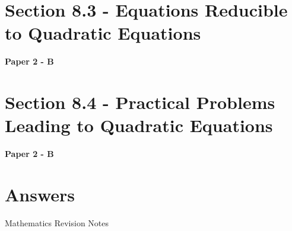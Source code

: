 \documentclass[12pt, a4paper]{article}
\begin{document}
\section*{Section 8.3 - Equations Reducible to Quadratic Equations \NF}\label{section:4-8-3}

\textbf{Paper 2 - B}
\begin{enumx}[label=\arabic*.,start=2]
\item {}\label{DSE2013-CoreP2-Q34} 
\item {}\label{DSE2017-CoreP2-Q33} 
\item {}\label{DSE2017-CoreP2-Q34} 
\item {}\label{DSE2019-CoreP2-Q32} 
\end{enumx}




\section*{Section 8.4 - Practical Problems Leading to Quadratic Equations \NF}\label{section:4-8-4}

\textbf{Paper 2 - B}
\begin{enumx}[label=\arabic*.,start=6]
\item {}\label{DSE2020-CoreP2-Q32} 
\end{enumx}
\section*{Answers}
\begin{enumx}[label=\arabic*.,start=1]
\item {}
\item {}
\item {}
\item {}
\item {}
\item {}
\end{enumx}
\newpage
\newpage
\thispagestyle{empty}
\begin{center}
Mathematics Revision Notes\\\vspace{1cm}
\\\vspace{1cm}
{\fontsize{24pt}{24pt}\selectfont {Variations}} \\\vspace{1cm}
\label{chapter:S4-9}

\end{center}
\vspace{0.5cm}
\hline
\end{document}
